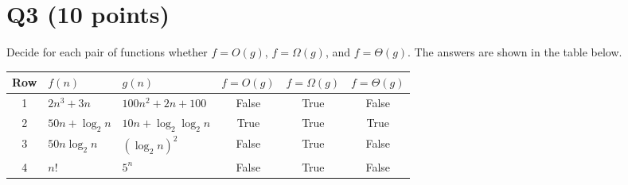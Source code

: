 \documentclass[12pt]{article}
\begin{document}
\section*{Q3 (10 points)}
Decide for each pair of functions whether $f = O(g)$, $f = \Omega(g)$, and $f = \Theta(g)$. The answers are shown in the table below.

\begin{center}
\begin{tabular}{c l l c c c}
\hline
Row & $f(n)$ & $g(n)$ & $f=O(g)$ & $f=\Omega(g)$ & $f=\Theta(g)$ \\
\hline
1 & $2n^3 + 3n$ & $100n^2 + 2n + 100$ & False & True & False \\
2 & $50n + \log_2 n$ & $10n + \log_2\log_2 n$ & True & True & True \\
3 & $50n \log_2 n$ & $(\log_2 n)^2$ & False & True & False \\
4 & $n!$ & $5^n$ & False & True & False \\
\hline
\end{tabular}
\end{center}
\end{document}
